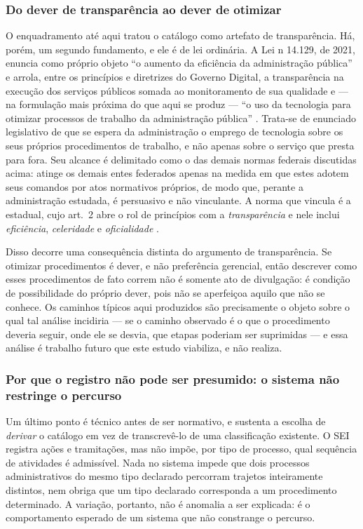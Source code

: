 \subsubsection{Do dever de transparência ao dever de otimizar}
\label{sec:rev-otimizar}

O enquadramento até aqui tratou o catálogo como artefato de transparência. Há, porém, um segundo
fundamento, e ele é de lei ordinária. A Lei n\textordmasculine{} 14.129, de 2021, enuncia como
próprio objeto ``o aumento da eficiência da administração pública'' e arrola, entre os princípios
e diretrizes do Governo Digital, a transparência na execução dos serviços públicos somada ao
monitoramento de sua qualidade e --- na formulação mais próxima do que aqui se produz --- ``o uso
da tecnologia para otimizar processos de trabalho da administração pública''
\cite{brasil2021govdigital}. Trata-se de enunciado legislativo de que se espera da administração
o emprego de tecnologia sobre os seus próprios procedimentos de trabalho, e não apenas sobre o
serviço que presta para fora. Seu alcance é delimitado como o das demais normas federais
discutidas acima: atinge os demais entes federados apenas na medida em que estes adotem seus
comandos por atos normativos próprios, de modo que, perante a administração estudada, é
persuasivo e não vinculante. A norma que vincula é a estadual, cujo art.~2\textordmasculine{}
abre o rol de princípios com a \emph{transparência} e nele inclui \emph{eficiência},
\emph{celeridade} e \emph{oficialidade} \cite{state2016procedurelaw}.

Disso decorre uma consequência distinta do argumento de transparência. Se otimizar
procedimentos é dever, e não preferência gerencial, então descrever como esses procedimentos de
fato correm não é somente ato de divulgação: é condição de possibilidade do próprio dever, pois
não se aperfeiçoa aquilo que não se conhece. Os caminhos típicos aqui produzidos são precisamente
o objeto sobre o qual tal análise incidiria --- se o caminho observado é o que o procedimento
deveria seguir, onde ele se desvia, que etapas poderiam ser suprimidas --- e essa análise é
trabalho futuro que este estudo viabiliza, e não realiza.

\subsubsection{Por que o registro não pode ser presumido: o sistema não restringe o percurso}
\label{sec:rev-naorestringe}

Um último ponto é técnico antes de ser normativo, e sustenta a escolha de \emph{derivar} o
catálogo em vez de transcrevê-lo de uma classificação existente. O SEI registra ações e
tramitações, mas não impõe, por tipo de processo, qual sequência de atividades é admissível. Nada
no sistema impede que dois processos administrativos do mesmo tipo declarado percorram trajetos
inteiramente distintos, nem obriga que um tipo declarado corresponda a um procedimento
determinado. A variação, portanto, não é anomalia a ser explicada: é o comportamento esperado de
um sistema que não constrange o percurso.

